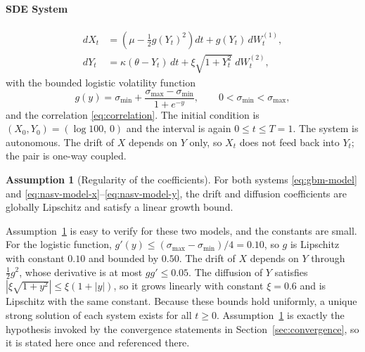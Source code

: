 \documentclass[11pt,a4paper]{article}
\theoremstyle{definition}
\newtheorem{assumption}[theorem]{Assumption}
\theoremstyle{remark}
\begin{document}
\paragraph{SDE System}
\begin{align}
    dX_t &= \left( \mu - \tfrac12 g(Y_t)^2 \right) dt + g(Y_t)\, dW_t^{(1)},
    \label{eq:nasv-model-x} \\[2pt]
    dY_t &= \kappa (\theta - Y_t)\, dt + \xi \sqrt{1 + Y_t^{2}}\; dW_t^{(2)},
    \label{eq:nasv-model-y}
\end{align}
with the bounded logistic volatility function
\begin{equation}
    g(y) = \sigma_{\min} + \frac{\sigma_{\max} - \sigma_{\min}}{1 + e^{-y}},
    \qquad 0 < \sigma_{\min} < \sigma_{\max},
    \label{eq:nasv-g}
\end{equation}
and the correlation \eqref{eq:correlation}. The initial condition is $(X_0, Y_0) = (\log 100,\, 0)$ and the interval is again $0 \le t \le T = 1$. The system is autonomous. The drift of $X$ depends on $Y$ only, so $X_t$ does not feed back into $Y_t$; the pair is one-way coupled.
\begin{assumption}[Regularity of the coefficients]
\label{ass:regularity}
For both systems \eqref{eq:gbm-model} and \eqref{eq:nasv-model-x}--\eqref{eq:nasv-model-y}, the drift and diffusion coefficients are globally Lipschitz and satisfy a linear growth bound.
\end{assumption}
Assumption~\ref{ass:regularity} is easy to verify for these two models, and the constants are small. For the logistic function, $g'(y) \le (\sigma_{\max} - \sigma_{\min})/4 = 0.10$, so $g$ is Lipschitz with constant $0.10$ and bounded by $0.50$. The drift of $X$ depends on $Y$ through $\tfrac12 g^2$, whose derivative is at most $g g' \le 0.05$. The diffusion of $Y$ satisfies $\left| \xi \sqrt{1 + y^2} \right| \le \xi (1 + |y|)$, so it grows linearly with constant $\xi = 0.6$ and is Lipschitz with the same constant. Because these bounds hold uniformly, a unique strong solution of each system exists for all $t \ge 0$. Assumption~\ref{ass:regularity} is exactly the hypothesis invoked by the convergence statements in Section~\ref{sec:convergence}, so it is stated here once and referenced there.
\end{document}

